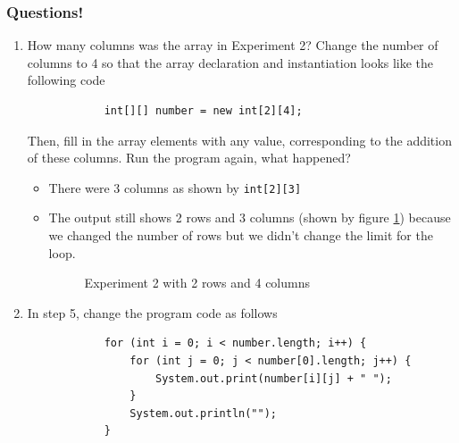 \documentclass[12pt,titlepage]{article}
\begin{document}
\pagebreak

\subsubsection*{Questions!}
\begin{enumerate}
    \item {
        How many columns was the array in Experiment 2? Change the number of columns to 4 so that the array declaration and instantiation looks like the following code
        
        \begin{verbatim}
            int[][] number = new int[2][4];
        \end{verbatim}

        Then, fill in the array elements with any value, corresponding to the addition of these columns. Run the program again, what happened?

        \begin{itemize}
            \item There were 3 columns as shown by \texttt{int[2][3]}
            \item {
                The output still shows 2 rows and 3 columns (shown by figure \ref{arr2-col}) because we changed the number of rows but we didn't change the limit for the loop.

                \begin{figure}[h]
                    \centering
                    \caption{Experiment 2 with 2 rows and 4 columns}
                    \label{arr2-col}
                \end{figure}
            }
        \end{itemize}
    }
    \item {
        In step 5, change the program code as follows

        \begin{verbatim}
            for (int i = 0; i < number.length; i++) {
                for (int j = 0; j < number[0].length; j++) {
                    System.out.print(number[i][j] + " ");
                }
                System.out.println("");
            }
        \end{verbatim}

}
\end{enumerate}
\end{document}
